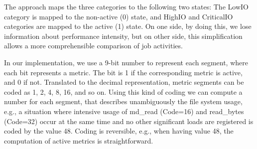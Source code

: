 \documentclass{jhps}
\begin{document}
The approach maps the three categories to the following two states: The LowIO category is mapped to the non-active (0) state, and HighIO and CriticalIO categories are mapped to the active (1) state.
On one side, by doing this, we lose information about performance intensity, but on other side, this simplification allows a more comprehensible comparison of job activities.

In our implementation, we use a 9-bit number to represent each segment, where each bit represents a metric.
The bit is 1 if the corresponding metric is active, and 0 if not.
Translated to the decimal representation, metric segments can be coded as 1, 2, 4, 8, 16, and so on.
Using this kind of coding we can compute a number for each segment, that describes unambiguously the file system usage, e.g., a situation where intensive usage of md\_read (Code=16) and read\_bytes (Code=32) occur at the same time and no other significant loads are registered is coded by the value 48.
Coding is reversible, e.g., when having value 48, the computation of active metrics is straightforward.

\end{document}
